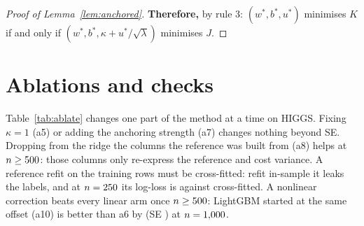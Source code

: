 \documentclass{article}
\begin{document}
\begin{proof}[Proof of Lemma~\ref{lem:anchored}]
\textbf{Therefore,} by rule 3: $(w^*,b^*,u^*)$ minimises $K$ if and only if $(w^*, b^*, \kappa + u^*/\sqrt{\lambda})$ minimises $J$.
\end{proof}

\section{Ablations and checks}
\label{app:checks}

Table~\ref{tab:ablate} changes one part of the method at a time on HIGGS.
Fixing $\kappa = 1$ (a5) or adding the anchoring strength (a7) changes nothing beyond \nWinK{} SE.
Dropping from the ridge the \nHgLowCols{} columns the reference was built from (a8) helps at $n \ge 500$: those columns only re-express the reference and cost variance.
A reference refit on the training rows must be cross-fitted: refit in-sample it leaks the labels, and at $n = 250$ its log-loss is \nHgTwoFiftyLocInLL{} against \nHgTwoFiftyLocCfLL{} cross-fitted.
A nonlinear correction beats every linear arm once $n \ge 500$: LightGBM started at the same offset (a10) is better than a6 by \nHgOneKDKcvGbm{} (SE \nHgOneKDKcvGbmSe) at $n = 1{,}000$.
\end{document}
